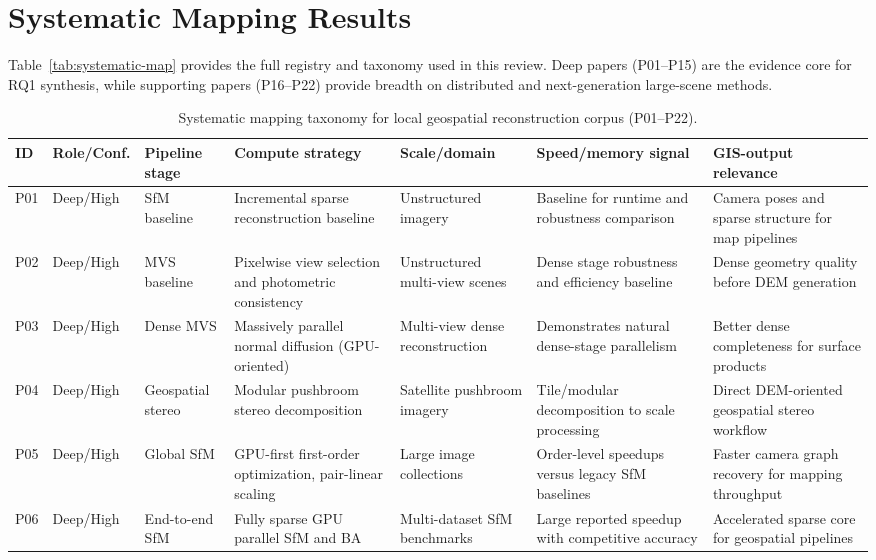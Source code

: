 \section{Systematic Mapping Results}

Table~\ref{tab:systematic-map} provides the full registry and taxonomy used in this review. Deep papers (P01--P15) are the evidence core for RQ1 synthesis, while supporting papers (P16--P22) provide breadth on distributed and next-generation large-scene methods.

\begin{table}[ht]
\centering
\caption{Systematic mapping taxonomy for local geospatial reconstruction corpus (P01--P22).}
\scriptsize
\begin{tabular}{p{}p{}p{}p{}p{}p{}p{}}
\hline
\textbf{ID} & \textbf{Role/Conf.} & \textbf{Pipeline stage} & \textbf{Compute strategy} & \textbf{Scale/domain} & \textbf{Speed/memory signal} & \textbf{GIS-output relevance} \\
\hline
P01 & Deep/High & SfM baseline & Incremental sparse reconstruction baseline & Unstructured imagery & Baseline for runtime and robustness comparison & Camera poses and sparse structure for map pipelines \\
P02 & Deep/High & MVS baseline & Pixelwise view selection and photometric consistency & Unstructured multi-view scenes & Dense stage robustness and efficiency baseline & Dense geometry quality before DEM generation \\
P03 & Deep/High & Dense MVS & Massively parallel normal diffusion (GPU-oriented) & Multi-view dense reconstruction & Demonstrates natural dense-stage parallelism & Better dense completeness for surface products \\
P04 & Deep/High & Geospatial stereo & Modular pushbroom stereo decomposition & Satellite pushbroom imagery & Tile/modular decomposition to scale processing & Direct DEM-oriented geospatial stereo workflow \\
P05 & Deep/High & Global SfM & GPU-first first-order optimization, pair-linear scaling & Large image collections & Order-level speedups versus legacy SfM baselines & Faster camera graph recovery for mapping throughput \\
P06 & Deep/High & End-to-end SfM & Fully sparse GPU parallel SfM and BA & Multi-dataset SfM benchmarks & Large reported speedup with competitive accuracy & Accelerated sparse core for geospatial pipelines \\

\end{tabular}
\end{table}
